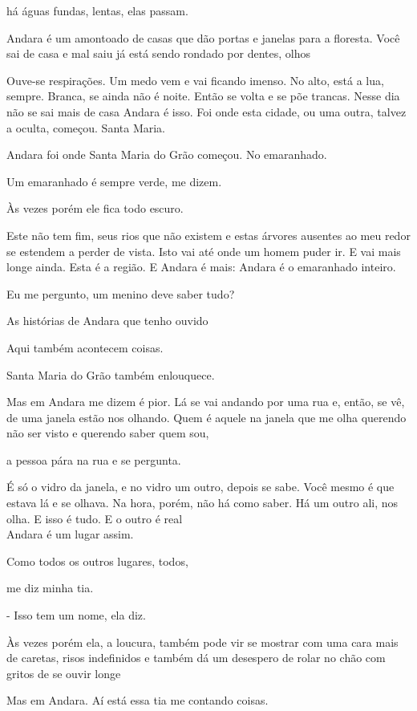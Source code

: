 há águas fundas, lentas, elas passam.

Andara é um amontoado de casas que dão portas e janelas para a floresta.
Você sai de casa e mal saiu já está sendo rondado por dentes, olhos

Ouve-se respirações. Um medo vem e vai ficando imenso. No alto, está a
lua, sempre. Branca, se ainda não é noite. Então se volta e se põe
trancas. Nesse dia não se sai mais de casa Andara é isso. Foi onde esta
cidade, ou uma outra, talvez a oculta, começou. Santa Maria.

Andara foi onde Santa Maria do Grão começou. No emaranhado.

Um emaranhado é sempre verde, me dizem.

Às vezes porém ele fica todo escuro.

Este não tem fim, seus rios que não existem e estas árvores ausentes ao
meu redor se estendem a perder de vista. Isto vai até onde um homem
puder ir. E vai mais longe ainda. Esta é a região. E Andara é mais:
Andara é o emaranhado inteiro.

Eu me pergunto, um menino deve saber tudo?

As histórias de Andara que tenho ouvido

Aqui também acontecem coisas.

Santa Maria do Grão também enlouquece.

Mas em Andara me dizem é pior. Lá se vai andando por uma rua e, então,
se vê, de uma janela estão nos olhando. Quem é aquele na janela que me
olha querendo não ser visto e querendo saber quem sou,

a pessoa pára na rua e se pergunta.

É só o vidro da janela, e no vidro um outro, depois se sabe. Você mesmo
é que estava lá e se olhava. Na hora, porém, não há como saber. Há um
outro ali, nos olha. E isso é tudo. E o outro é real\\

Andara é um lugar assim.

Como todos os outros lugares, todos,

me diz minha tia.

- Isso tem um nome, ela diz.

Às vezes porém ela, a loucura, também pode vir se mostrar com uma cara
mais de caretas, risos indefinidos e também dá um desespero de rolar no
chão com gritos de se ouvir longe

Mas em Andara. Aí está essa tia me contando coisas.

